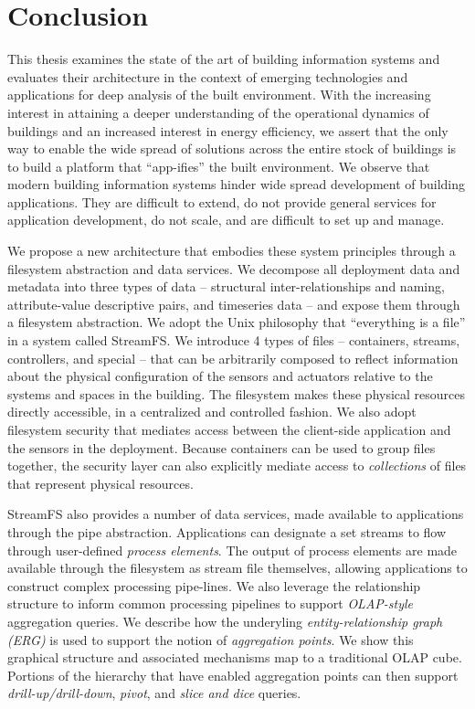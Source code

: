 \section{Conclusion}
\label{chap:done}

This thesis examines the state of the art of building information systems and evaluates their architecture in the context
of emerging technologies and applications for deep analysis of the built environment.  With the increasing interest in
attaining a deeper understanding of the operational dynamics of buildings and an increased interest in energy efficiency,
we assert that the only way to enable the wide spread of solutions across the entire stock of buildings is to build a platform
that ``app-ifies'' the built environment.  We observe that modern building information systems hinder wide spread development 
of building applications.  They are difficult to extend, do not provide general services for application development, do not
scale, and are difficult to set up and manage.  

We propose a new architecture that embodies these system principles through a filesystem abstraction and data services.  We decompose
all deployment data and metadata into three types of data -- structural inter-relationships and naming, attribute-value descriptive pairs,
and timeseries data -- and expose them through a filesystem abstraction.  We adopt the Unix philosophy that ``everything is a file'' in a
system called StreamFS.  We introduce 4 types of files -- containers, streams, controllers, and special -- that can be arbitrarily
composed to reflect information about the physical configuration of the sensors and actuators relative to the systems and spaces in
the building.  The filesystem makes these physical resources directly accessible, in a centralized and controlled fashion.  We
also adopt filesystem security that mediates access between the client-side application and the sensors in the deployment.
Because containers can be used to group files together, the security layer can also explicitly mediate access to \emph{collections}
of files that represent physical resources.

StreamFS also provides a number of data services, made available to applications through the pipe abstraction.  Applications can 
designate a set streams to flow through user-defined \emph{process elements}.  The output of process elements are made available
through the filesystem as stream file themselves, allowing applications to construct complex processing pipe-lines.
We also leverage the relationship structure to inform common processing pipelines to support \emph{OLAP-style} aggregation
queries.  We describe how the underyling \emph{entity-relationship graph (ERG)} is used to support the notion of \emph{aggregation points}.
We show this graphical structure and associated mechanisms map to a traditional OLAP cube.  Portions of the hierarchy that have 
enabled aggregation points can then support \emph{drill-up/drill-down}, \emph{pivot}, and \emph{slice and dice} queries.

